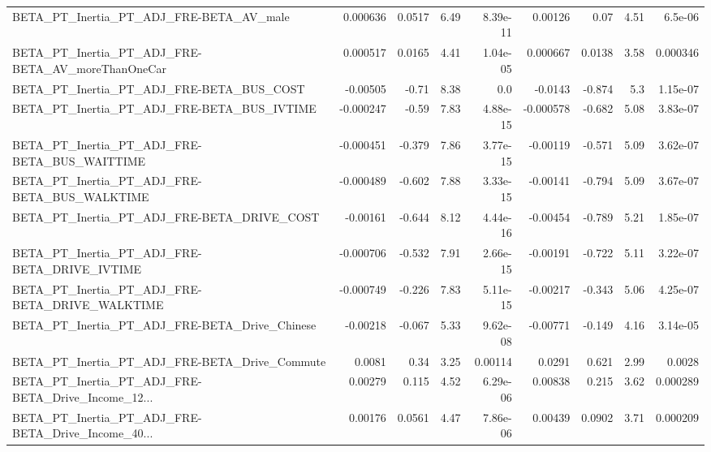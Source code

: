 \begin{tabular}{lrrrrrrrr}
BETA\_PT\_Inertia\_PT\_ADJ\_FRE-BETA\_AV\_male            &    0.000636 &       0.0517 &     6.49 & 8.39e-11 &    0.00126 &        0.07 &         4.51 &       6.5e-06 \\
BETA\_PT\_Inertia\_PT\_ADJ\_FRE-BETA\_AV\_moreThanOneCar  &    0.000517 &       0.0165 &     4.41 & 1.04e-05 &   0.000667 &      0.0138 &         3.58 &      0.000346 \\
BETA\_PT\_Inertia\_PT\_ADJ\_FRE-BETA\_BUS\_COST           &    -0.00505 &        -0.71 &     8.38 &      0.0 &    -0.0143 &      -0.874 &          5.3 &      1.15e-07 \\
BETA\_PT\_Inertia\_PT\_ADJ\_FRE-BETA\_BUS\_IVTIME         &   -0.000247 &        -0.59 &     7.83 & 4.88e-15 &  -0.000578 &      -0.682 &         5.08 &      3.83e-07 \\
BETA\_PT\_Inertia\_PT\_ADJ\_FRE-BETA\_BUS\_WAITTIME       &   -0.000451 &       -0.379 &     7.86 & 3.77e-15 &   -0.00119 &      -0.571 &         5.09 &      3.62e-07 \\
BETA\_PT\_Inertia\_PT\_ADJ\_FRE-BETA\_BUS\_WALKTIME       &   -0.000489 &       -0.602 &     7.88 & 3.33e-15 &   -0.00141 &      -0.794 &         5.09 &      3.67e-07 \\
BETA\_PT\_Inertia\_PT\_ADJ\_FRE-BETA\_DRIVE\_COST         &    -0.00161 &       -0.644 &     8.12 & 4.44e-16 &   -0.00454 &      -0.789 &         5.21 &      1.85e-07 \\
BETA\_PT\_Inertia\_PT\_ADJ\_FRE-BETA\_DRIVE\_IVTIME       &   -0.000706 &       -0.532 &     7.91 & 2.66e-15 &   -0.00191 &      -0.722 &         5.11 &      3.22e-07 \\
BETA\_PT\_Inertia\_PT\_ADJ\_FRE-BETA\_DRIVE\_WALKTIME     &   -0.000749 &       -0.226 &     7.83 & 5.11e-15 &   -0.00217 &      -0.343 &         5.06 &      4.25e-07 \\
BETA\_PT\_Inertia\_PT\_ADJ\_FRE-BETA\_Drive\_Chinese      &    -0.00218 &       -0.067 &     5.33 & 9.62e-08 &   -0.00771 &      -0.149 &         4.16 &      3.14e-05 \\
BETA\_PT\_Inertia\_PT\_ADJ\_FRE-BETA\_Drive\_Commute      &      0.0081 &         0.34 &     3.25 &  0.00114 &     0.0291 &       0.621 &         2.99 &        0.0028 \\
BETA\_PT\_Inertia\_PT\_ADJ\_FRE-BETA\_Drive\_Income\_12... &     0.00279 &        0.115 &     4.52 & 6.29e-06 &    0.00838 &       0.215 &         3.62 &      0.000289 \\
BETA\_PT\_Inertia\_PT\_ADJ\_FRE-BETA\_Drive\_Income\_40... &     0.00176 &       0.0561 &     4.47 & 7.86e-06 &    0.00439 &      0.0902 &         3.71 &      0.000209 \\

\end{tabular}
